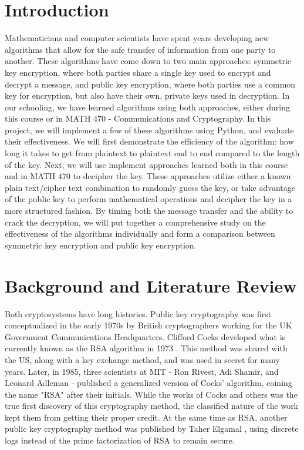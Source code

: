 \documentclass[12pt]{report}
\begin{document}
\section{Introduction}
Mathematicians and computer scientists have spent years developing new algorithms that allow for the safe transfer of information from one party to another.
These algorithms have come down to two main approaches: symmetric key encryption, where both parties share a single key used to encrypt and decrypt a message,
and public key encryption, where both parties use a common key for encryption, but also have their own, private keys used in decryption. In our schooling, we
have learned algorithms using both approaches, either during this course or in MATH 470 - Communications and Cryptography. In this project, we will implement a few
of these algorithms using Python, and evaluate their effectiveness. We will first demonstrate the efficiency of the algorithm: how long it
takes to get from plaintext to plaintext end to end compared to the length of the key. Next, we will use implement approaches learned both in this course and
in MATH 470 to decipher the key. These approaches utilize either a known plain text/cipher text combination to randomly guess the key, or take advantage of the
public key to perform mathematical operations and decipher the key in a more structured fashion. By timing both the message transfer and the ability to crack the
decryption, we will put together a comprehensive study on the effectiveness of the algorithms individually and form a comparison between symmetric key encryption
and public key encryption.

\section{Background and Literature Review}
Both cryptosystems have long histories. Public key cryptography was first conceptualized in the early 1970s by British cryptographers working for the UK Government
Communications Headquarters. Clifford Cocks developed what is currently known as the RSA algorithm in 1973 \cite{class}. This method was shared with the US, along
with a key exchange method, and was used in secret for many years. Later, in 1985, three scientists at MIT - Ron Rivest, Adi Shamir, and Leonard Adleman - published
a generalized version of Cocks' algorithm, coining the name "RSA" after their initials. While the works of Cocks and others was the true first discovery of this
cryptography method, the classified nature of the work kept them from getting their proper credit. At the same time as RSA, another public key cryptography method
was published by Taher Elgamal \cite{elgamal}, using discrete logs instead of the prime factorization of RSA to remain secure.
\end{document}
